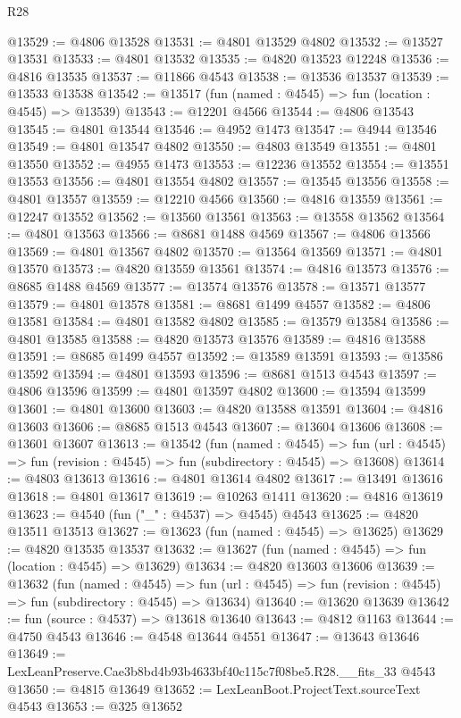 \begin{lexlean}{R28}
\begin{coremodule}
@13529 := @4806 @13528
@13531 := @4801 @13529 @4802
@13532 := @13527 @13531
@13533 := @4801 @13532
@13535 := @4820 @13523 @12248
@13536 := @4816 @13535
@13537 := @11866 @4543
@13538 := @13536 @13537
@13539 := @13533 @13538
@13542 := @13517 (fun (named : @4545) => fun (location : @4545) => @13539)
@13543 := @12201 @4566
@13544 := @4806 @13543
@13545 := @4801 @13544
@13546 := @4952 @1473
@13547 := @4944 @13546
@13549 := @4801 @13547 @4802
@13550 := @4803 @13549
@13551 := @4801 @13550
@13552 := @4955 @1473
@13553 := @12236 @13552
@13554 := @13551 @13553
@13556 := @4801 @13554 @4802
@13557 := @13545 @13556
@13558 := @4801 @13557
@13559 := @12210 @4566
@13560 := @4816 @13559
@13561 := @12247 @13552
@13562 := @13560 @13561
@13563 := @13558 @13562
@13564 := @4801 @13563
@13566 := @8681 @1488 @4569
@13567 := @4806 @13566
@13569 := @4801 @13567 @4802
@13570 := @13564 @13569
@13571 := @4801 @13570
@13573 := @4820 @13559 @13561
@13574 := @4816 @13573
@13576 := @8685 @1488 @4569
@13577 := @13574 @13576
@13578 := @13571 @13577
@13579 := @4801 @13578
@13581 := @8681 @1499 @4557
@13582 := @4806 @13581
@13584 := @4801 @13582 @4802
@13585 := @13579 @13584
@13586 := @4801 @13585
@13588 := @4820 @13573 @13576
@13589 := @4816 @13588
@13591 := @8685 @1499 @4557
@13592 := @13589 @13591
@13593 := @13586 @13592
@13594 := @4801 @13593
@13596 := @8681 @1513 @4543
@13597 := @4806 @13596
@13599 := @4801 @13597 @4802
@13600 := @13594 @13599
@13601 := @4801 @13600
@13603 := @4820 @13588 @13591
@13604 := @4816 @13603
@13606 := @8685 @1513 @4543
@13607 := @13604 @13606
@13608 := @13601 @13607
@13613 := @13542
    (fun (named : @4545) =>
    fun (url : @4545) => fun (revision : @4545) => fun (subdirectory : @4545) => @13608)
@13614 := @4803 @13613
@13616 := @4801 @13614 @4802
@13617 := @13491 @13616
@13618 := @4801 @13617
@13619 := @10263 @1411
@13620 := @4816 @13619
@13623 := @4540 (fun ("_" : @4537) => @4545) @4543
@13625 := @4820 @13511 @13513
@13627 := @13623 (fun (named : @4545) => @13625)
@13629 := @4820 @13535 @13537
@13632 := @13627 (fun (named : @4545) => fun (location : @4545) => @13629)
@13634 := @4820 @13603 @13606
@13639 := @13632
    (fun (named : @4545) =>
    fun (url : @4545) => fun (revision : @4545) => fun (subdirectory : @4545) => @13634)
@13640 := @13620 @13639
@13642 := fun (source : @4537) => @13618 @13640
@13643 := @4812 @1163
@13644 := @4750 @4543
@13646 := @4548 @13644 @4551
@13647 := @13643 @13646
@13649 := LexLeanPreserve.Cae3b8bd4b93b4633bf40c115c7f08be5.R28.__fits_33 @4543
@13650 := @4815 @13649
@13652 := LexLeanBoot.ProjectText.sourceText @4543
@13653 := @325 @13652

\end{coremodule}
\end{lexlean}

